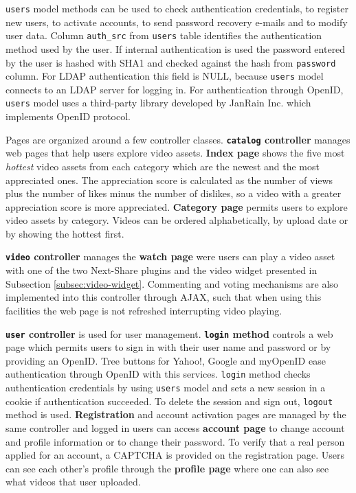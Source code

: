 \texttt{users} model methods can be used to check authentication credentials, to register new users, to activate accounts, to send password recovery e-mails and to modify user data. Column \texttt{auth_src} from \texttt{users} table identifies the authentication method used by the user. If internal authentication is used the password entered by the user is hashed with SHA1 and checked against the hash from \texttt{password} column. For LDAP authentication this field is NULL, because \texttt{users} model connects to an LDAP server for logging in. For authentication through OpenID, \texttt{users} model uses a third-party library developed by JanRain Inc. \cite{janrain-openid} which implements OpenID protocol.

Pages are organized around a few controller classes. \textbf{\texttt{catalog} controller} manages web pages that help users explore video assets. \textbf{Index page} shows the five most \textit{hottest} video assets from each category which are the newest and the most appreciated ones. The appreciation score is calculated as the number of views plus the number of likes minus the number of dislikes, so a video with a greater appreciation score is more appreciated. \textbf{Category page} permits users to explore video assets by category. Videos can be ordered alphabetically, by upload date or by showing the hottest first.

\textbf{\texttt{video} controller} manages the \textbf{watch page} were users can play a video asset with one of the two Next-Share plugins and the video widget presented in Subsection \ref{subsec:video-widget}. Commenting and voting mechanisms are also implemented into this controller through AJAX, such that when using this facilities the web page is not refreshed interrupting video playing.

\textbf{\texttt{user} controller} is used for user management. \textbf{\texttt{login} method} controls a web page which permits users to sign in with their user name and password or by providing an OpenID. Tree buttons for Yahoo!, Google and myOpenID ease authentication through OpenID with this services. \texttt{login} method checks authentication credentials by using \texttt{users} model and sets a new session in a cookie if authentication succeeded. To delete the session and sign out, \texttt{logout} method is used. \textbf{Registration} and account activation pages are managed by the same controller and logged in users can access \textbf{account page} to change account and profile information or to change their password. To verify that a real person applied for an account, a CAPTCHA is provided on the registration page. Users can see each other's profile through the \textbf{profile page} where one can also see what videos that user uploaded.

